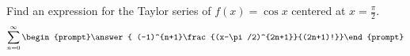 \documentclass{ximera}
\author{Gregory Hartman \and Matthew Carr}
\begin{document}
\begin{exercise}






Find an expression for the Taylor series of $f(x)=\cos x$ centered at $x=\frac{\pi}{2}$.
\[
\sum_{n=0}^{\infty}\begin{prompt}\answer{ (-1)^{n+1}\frac{(x-\pi/2)^{2n+1}}{(2n+1)!}}\end{prompt}
\]

\end{exercise}
\end{document}

